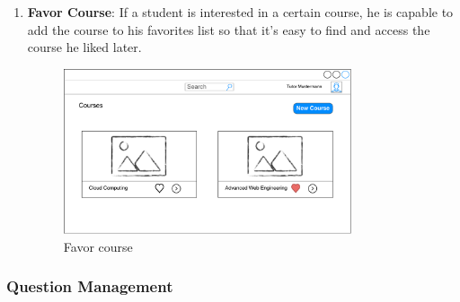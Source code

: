 \begin{enumerate}
\item
\textbf{Favor Course}: If a student is interested in a certain course, he is capable to add the course to his favorites list so that it's easy to find and access the course he liked later.

\begin{figure}[!htbp]
  \centering
    \includegraphics[width=0.8\textwidth]{Figures/mockup/Favour-Course.pdf}
  \caption{Favor course}
\end{figure}

\end{enumerate}

\subsubsection{Question Management}

